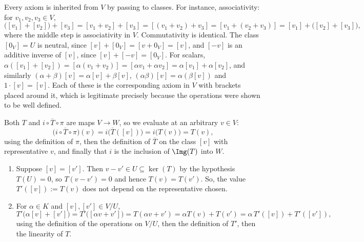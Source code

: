 \begin{exercisesolution}
\label{sol:quotient_axioms}
Every axiom is inherited from $V$ by passing to classes. For instance, associativity: for $v_1, v_2, v_3 \in V$,
\[
\big([v_1] + [v_2]\big) + [v_3] = [v_1 + v_2] + [v_3] = [(v_1 + v_2) + v_3] = [v_1 + (v_2 + v_3)] = [v_1] + \big([v_2] + [v_3]\big),
\]
where the middle step is associativity in $V$. Commutativity is identical. The class $[0_V] = U$ is neutral, since $[v] + [0_V] = [v + 0_V] = [v]$, and $[-v]$ is an additive inverse of $[v]$, since $[v] + [-v] = [0_V]$. For scalars, $\alpha([v_1] + [v_2]) = [\alpha(v_1+v_2)] = [\alpha v_1 + \alpha v_2] = \alpha[v_1] + \alpha[v_2]$, and similarly $(\alpha + \beta)[v] = \alpha[v] + \beta[v]$, $(\alpha\beta)[v] = \alpha(\beta[v])$ and $1 \cdot [v] = [v]$. Each of these is the corresponding axiom in $V$ with brackets placed around it, which is legitimate precisely because the operations were shown to be well defined.
\end{exercisesolution}

\begin{exercisesolution}
\label{sol:first_iso_diagram}
Both $T$ and $i \circ \overline{T} \circ \pi$ are maps $V \to W$, so we evaluate at an arbitrary $v \in V$:
\[
\big(i \circ \overline{T} \circ \pi\big)(v) = i\big(\overline{T}([v])\big) = i\big(T(v)\big) = T(v),
\]
using the definition of $\pi$, then the definition of $\overline{T}$ on the class $[v]$ with representative $v$, and finally that $i$ is the inclusion of $\Img(T)$ into $W$.
\end{exercisesolution}

\begin{exercisesolution}
\label{sol:induced_map_well_defined}
\begin{enumerate}[label=\textbf{(\alph*)}]
    \item Suppose $[v] = [v']$. Then $v - v' \in U \subseteq \ker(T)$ by the hypothesis $T(U) = 0$, so $T(v - v') = 0$ and hence $T(v) = T(v')$. So, the value $T'([v]) := T(v)$ does not depend on the representative chosen.
    \item For $\alpha \in K$ and $[v], [v'] \in V/U$,
    \[
    T'\big(\alpha [v] + [v']\big) = T'\big([\alpha v + v']\big) = T(\alpha v + v') = \alpha T(v) + T(v') = \alpha \, T'([v]) + T'([v']),
    \]
    using the definition of the operations on $V/U$, then the definition of $T'$, then the linearity of $T$. \qedhere
\end{enumerate}
\end{exercisesolution}

